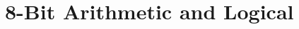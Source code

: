 \documentclass[12pt,twoside,openright,a4paper]{book}
\begin{document}
\newcommand{\Empty}[1]{& \multicolumn{16}{l}{} & \Comment{#1} \\}

\newcommand{\InstrTableContinue}{
	\vspace*{-2.5ex}
	{
		\scriptsize
		(continued on next page)
	}
}

%
%

\environbodyname\NOTEBODY
{}

\newcommand{\NoteItem}[1]{& #1 \\}

\newcommand{\NoteTableSingleItemSpaceCorrection}{
	\vspace*{-1ex}	%
}


\section{8-Bit Arithmetic and Logical}
\end{document}
